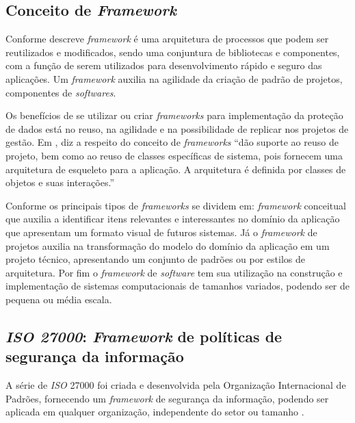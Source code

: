 \documentclass[
	12pt,				%
	openright,			%
	oneside,			%
	a4paper,			%
	english,			%
	french,				%
	spanish,			%
	brazil,				%
	]{abntex2}
\begin{document}
\subsection{Conceito de \textit{Framework}}

Conforme descreve \cite{Kechi2012} \textit{framework} é uma arquitetura de processos que podem ser reutilizados e modificados, sendo uma conjuntura de bibliotecas e componentes, com a função de serem utilizados para desenvolvimento rápido e seguro das aplicações. Um \textit{framework} auxilia na agilidade da criação de padrão de projetos, componentes de \textit{softwares}.

Os benefícios de se utilizar ou criar \textit{frameworks} para implementação da proteção de dados está no reuso, na agilidade e na possibilidade de replicar nos projetos de gestão. Em , diz a respeito do conceito de \textit{frameworks} “dão suporte ao reuso de projeto, bem como ao reuso de classes específicas de sistema, pois fornecem uma arquitetura de esqueleto para a aplicação. A arquitetura é definida por classes de objetos e suas interações.” 

Conforme  os principais tipos de \textit{frameworks} se dividem em: \textit{framework} conceitual que auxilia a identificar itens relevantes e interessantes no domínio da aplicação que apresentam um formato visual de futuros sistemas. Já o \textit{framework} de projetos auxilia na transformação do modelo do domínio da aplicação em um projeto técnico, apresentando um conjunto de padrões ou por estilos de arquitetura. Por fim o \textit{framework} de \textit{software} tem sua utilização na construção e implementação de sistemas computacionais de tamanhos variados, podendo ser de pequena ou média escala.

\subsection{\textit{ISO 27000}: \textit{Framework} de políticas de segurança da informação}

A série de \textit{ISO} 27000 foi criada e desenvolvida pela Organização Internacional de Padrões, fornecendo um \textit{framework} de segurança da informação, podendo ser aplicada em qualquer organização, independente do setor ou tamanho \cite{Pohlmann2019}.
\end{document}
